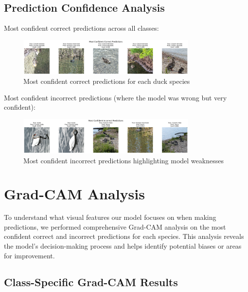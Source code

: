 \documentclass[12pt,a4paper]{article}
\begin{document}
\subsection{Prediction Confidence Analysis}

Most confident correct predictions across all classes:

\begin{figure}[H]
    \centering
    \includegraphics[width=0.8\textwidth]{../../output/best_model_duck_classification_f1_optimized_20250608_195712/plots/most_confident_correct.png}
    \caption{Most confident correct predictions for each duck species}
    \label{fig:confident_correct}
\end{figure}

Most confident incorrect predictions (where the model was wrong but very confident):

\begin{figure}[H]
    \centering
    \includegraphics[width=0.8\textwidth]{../../output/best_model_duck_classification_f1_optimized_20250608_195712/plots/most_confident_incorrect.png}
    \caption{Most confident incorrect predictions highlighting model weaknesses}
    \label{fig:confident_incorrect}
\end{figure}

\section{Grad-CAM Analysis}

To understand what visual features our model focuses on when making predictions, we performed comprehensive Grad-CAM analysis on the most confident correct and incorrect predictions for each species. This analysis reveals the model's decision-making process and helps identify potential biases or areas for improvement.

\subsection{Class-Specific Grad-CAM Results}
\end{document}
